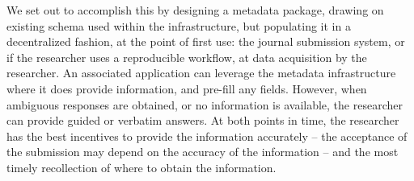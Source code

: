 We set out to accomplish this by designing a  metadata package, drawing on existing schema used within the infrastructure, but populating it in a decentralized fashion, at the point of first use: the journal submission system, or if the researcher uses a reproducible workflow, at data acquisition by the researcher. An associated application can leverage the metadata infrastructure where it does provide information,  and pre-fill any fields. However, when ambiguous responses are obtained, or no information is available, the researcher can provide guided or verbatim answers. At both points in time, the researcher has the best incentives to provide the information accurately -- the acceptance of the submission may depend on the accuracy of the information -- and the most timely recollection of where to obtain the information.

